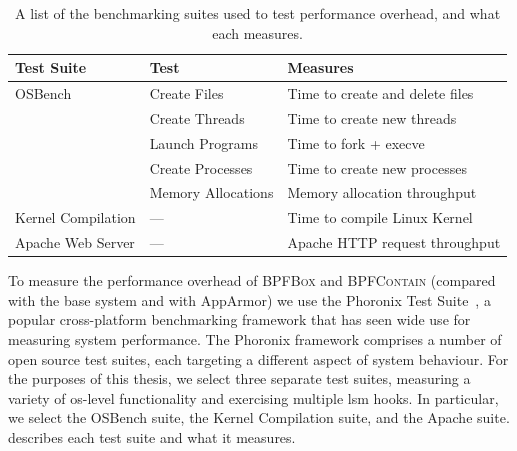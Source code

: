 \documentclass[
  fontsize=12pt,
  titlepage=firstiscover,
  paper=letter,
oneside,
  cleardoublepage=plain,
  parskip=half-,
  DIV=10,
  parindent,
  appendixprefix,
  chapterprefix,
  listof=totoc,
]{scrbook}
\newcommand{\bpfbox}{\textsc{BPFBox}}
\newcommand{\bpfcontain}{\textsc{BPFContain}}
\begin{document}
\begin{table}[htp]
  \centering
  \footnotesize
  \caption[List of benchmarking suites and what they measure]{
    A list of the benchmarking suites used to test performance overhead, and what each
    measures.
  }\label{tab:suites}
  \begin{tabular}{lll}
  \toprule
  Test Suite & Test & Measures \\
  \midrule
  OSBench                    & Create Files       & Time to create and delete files \\
                             & Create Threads     & Time to create new threads \\
                             & Launch Programs    & Time to fork + execve \\
                             & Create Processes   & Time to create new processes \\
                             & Memory Allocations & Memory allocation throughput \\
  Kernel Compilation         & ---                & Time to compile Linux Kernel \\
  Apache Web Server          & ---                & Apache HTTP request throughput \\
\bottomrule
  \end{tabular}
\end{table}

To measure the performance overhead of \bpfbox{} and \bpfcontain{} (compared with the base
system and with AppArmor) we use the Phoronix Test Suite~\cite{phoronix}, a popular
cross-platform benchmarking framework that has seen wide use for measuring system
performance. The Phoronix framework comprises a number of open source test suites, each
targeting a different aspect of system behaviour. For the purposes of this thesis, we
select three separate test suites, measuring a variety of \gls{os}-level functionality and
exercising multiple \gls{lsm} hooks. In particular, we select the OSBench suite, the
Kernel Compilation suite, and the Apache suite.  describes each test
suite and what it measures.
\end{document}
